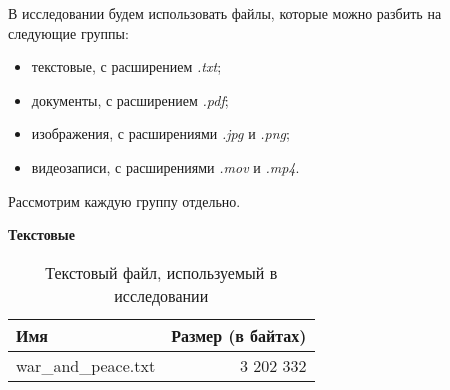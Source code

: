 

\begin{flushleft}
В исследовании будем использовать файлы, которые можно разбить на следующие группы:
\end{flushleft}
\begin{itemize}
\item текстовые, с расширением \textit{.txt};
\item документы, с расширением \textit{.pdf};
\item изображения, с расширениями \textit{.jpg} и \textit{.png};
\item видеозаписи, с расширениями \textit{.mov} и \textit{.mp4}.
\end{itemize}

Рассмотрим каждую группу отдельно.

\newpage
\textbf{Текстовые}

\begin{table}[h]
\centering
\caption{Текстовый файл, используемый в исследовании}
\begin{tabular}{|l|r|}
\hline
Имя & Размер (в байтах) \\
\hline
war\_and\_peace.txt & 3 202 332 \\
\hline
\end{tabular}
\end{table}

